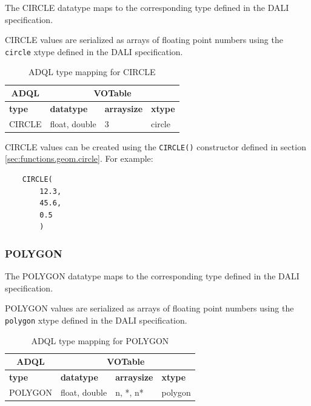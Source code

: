 \documentclass[11pt,a4paper]{ivoa}
\newcommand{\DALIspec}{DALI specification\xspace}
\begin{document}
The CIRCLE datatype maps to the corresponding type defined in the
\DALIspec.

CIRCLE values are serialized as arrays of floating point numbers
using the \verb:circle: xtype defined in the \DALIspec.

\begin{table}[thm]\footnotesize
    \begin{tabular}
        {|p{}|p{}|p{}|p{}|}
        \hline

        \hline
        \multicolumn{1}{|c|}{\textbf{ADQL}} &
        \multicolumn{3}{|c|}{\textbf{VOTable}}
        \tabularnewline
        
        \hline
        \textbf{type} &
        \textbf{datatype} &
        \textbf{arraysize} &
        \textbf{xtype}
        \tabularnewline

        \hline
        CIRCLE &
        float, double &
        3 &
        circle
        \tabularnewline

        \hline
    \end{tabular}
    \caption{ADQL type mapping for CIRCLE}
    \label{table:types.geom.circle}
\end{table}

CIRCLE values can be created using the \verb:CIRCLE():
constructor defined in section \ref{sec:functions.geom.circle}.
For example:
\begin{verbatim}
    CIRCLE(
        12.3,
        45.6,
        0.5
        )
\end{verbatim}

\subsubsection{POLYGON}
\label{sec:types.geom.polygon}

The POLYGON datatype maps to the corresponding type defined in the
\DALIspec.

POLYGON values are serialized as arrays of floating point numbers
using the \verb:polygon: xtype defined in the \DALIspec.

\begin{table}[thm]\footnotesize
    \begin{tabular}
        {|p{}|p{}|p{}|p{}|}
        \hline

        \hline
        \multicolumn{1}{|c|}{\textbf{ADQL}} &
        \multicolumn{3}{|c|}{\textbf{VOTable}}
        \tabularnewline
        
        \hline
        \textbf{type} &
        \textbf{datatype} &
        \textbf{arraysize} &
        \textbf{xtype}
        \tabularnewline

        \hline
        POLYGON &
        float, double &
        n, *, n* &
        polygon
        \tabularnewline

        \hline
    \end{tabular}
    \caption{ADQL type mapping for POLYGON}
    \label{table:types.geom.polygon}
\end{table}
\end{document}
